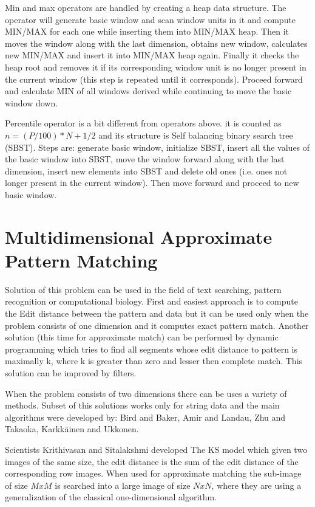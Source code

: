 Min and max operators are handled by creating a heap data structure. The operator will generate basic window and scan window units in it and compute MIN/MAX for each one while inserting them into MIN/MAX heap. Then it moves the window along with the last dimension, obtains new window, calculates new MIN/MAX and insert it into MIN/MAX heap again. Finally it checks the heap root and removes it if its corresponding window unit is no longer present in the current window (this step is repeated until it corresponds). Proceed forward and calculate MIN of all windows derived while continuing to move the basic window down.

Percentile operator is a bit different from operators above. it is counted as $n=(P/100)*N+1/2$ and its structure is Self balancing binary search tree (SBST). Steps are: generate basic window, initialize SBST, insert all the values of the basic window into SBST, move the window forward along with the last dimension, insert new elements into SBST and delete old ones (i.e. ones not longer present in the current window). Then move forward and proceed to new basic window. \cite{windowAggr}


\section{Multidimensional Approximate Pattern Matching}
Solution of this problem can be used in the field of text searching, pattern recognition or computational biology.
First and easiest approach is to compute the Edit distance between the pattern and data but it can be used only when the problem consists of one dimension and it computes exact pattern match. Another solution (this time for approximate match) can be performed by dynamic programming which tries to find all segments whose edit distance to pattern is maximally k, where k is greater than zero and lesser then complete match. This solution can be improved by filters.

When the problem consists of two dimensions there can be uses a variety of methods. Subset of this solutions works only for string data and the main algorithms were developed by: Bird and Baker, Amir and Landau, Zhu and Takaoka, Karkkäinen and Ukkonen.

Scientists Krithivasan and Sitalakshmi developed The KS model which given two images of the same size, the edit distance is the sum of the edit distance of the corresponding row images. When used for approximate matching the sub-image of size $MxM$ is searched into a large image of size $NxN$, where they are using a generalization of the classical one-dimensional algorithm.


